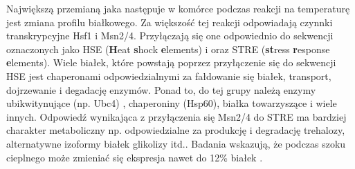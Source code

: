 \documentclass{pracamgr}
\begin{document}
 Największą przemianą jaka następuje w komórce podczas reakcji na temperaturę jest zmiana profilu białkowego. Za większość tej 
 reakcji odpowiadają czynnki transkrypcyjne Hsf1 i Msn2/4. Przyłączają się one odpowiednio do sekwencji oznaczonych jako 
 HSE (\textbf{H}eat \textbf{s}hock \textbf{e}lements) i oraz STRE (\textbf{st}ress \textbf{r}esponse \textbf{e}lements).
 Wiele białek, które powstają poprzez przyłączenie się do sekwencji HSE
 jest chaperonami odpowiedzialnymi za fałdowanie się białek, transport, dojrzewanie i degadację enzymów. Ponad to, do tej grupy
 należą enzymy ubikwitynujące (np. Ubc4) , chaperoniny (Hsp60), białka towarzyszące i wiele innych. Odpowiedź wynikająca z 
 przyłączenia się Msn2/4 do STRE ma bardziej charakter metaboliczny np. odpowiedzialne za produkcję i degradację trehalozy, 
 alternatywne izoformy białek glikolizy itd.\cite{MsnContraHsf1}. Badania wskazują, że podczas szoku cieplnego może zmieniać się
 ekspresja nawet do 12\% białek \cite{TransciptomeUponHeatShock}.
 
\end{document}
